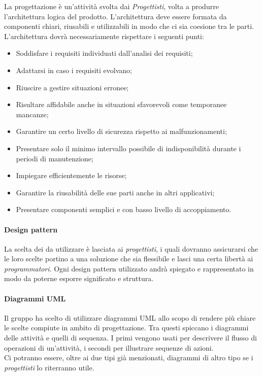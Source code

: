 La progettazione è un'attività svolta dai \emph{Progettisti}, volta a produrre l'architettura logica del prodotto. 
L'architettura deve essere formata da componenti chiari, riusabili e utilizzabili in modo che ci sia coesione tra 
le parti.\\
L'architettura dovrà necessariamente rispettare i seguenti punti: 
\begin{itemize}
    \item Soddisfare i requisiti individuati dall'analisi dei requisiti;
    \item Adattarsi in caso i requisiti evolvano;
    \item Riuscire a gestire situazioni erronee;
    \item Risultare affidabile anche in situazioni sfavorevoli come temporanee mancanze;
    \item Garantire un certo livello di sicurezza rispetto ai malfunzionamenti;
    \item Presentare solo il minimo intervallo possibile di indisponibilità durante i periodi di manutenzione;
    \item Impiegare efficientemente le risorse;
    \item Garantire la riusabilità delle sue parti anche in altri applicativi;
    \item Presentare componenti semplici e con basso livello di accoppiamento.
\end{itemize}
 
\paragraph{Design pattern}

La scelta dei  da utilizzare è lasciata ai \emph{progettisti}, i quali dovranno 
assicurarsi che le loro scelte portino a una soluzione che sia flessibile e lasci una certa libertà ai 
\emph{programmatori}. Ogni design pattern utilizzato andrà spiegato e rappresentato in modo da poterne esporre 
significato e struttura.

\paragraph{Diagrammi UML}

Il gruppo ha scelto di utilizzare diagrammi UML allo scopo di rendere più chiare le scelte compiute in ambito di 
progettazione. Tra questi spiccano i diagrammi delle attività e quelli di sequenza. I primi vengono 
usati per descrivere il flusso di operazioni di un'attività, i secondi per illustrare sequenze di azioni.\\
Ci potranno essere, oltre ai due tipi già menzionati, diagrammi di altro tipo se i \emph{progettisti} lo riterranno 
utile.

